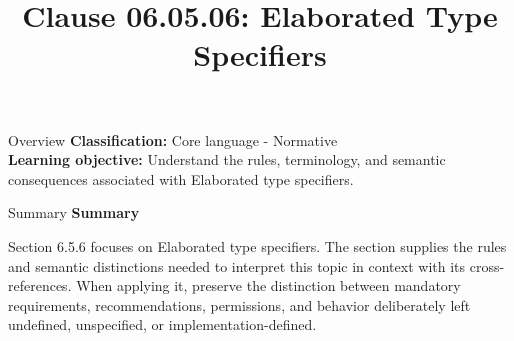 \documentclass[10pt,letterpaper]{article}
\title{Clause 06.05.06: Elaborated Type Specifiers}
\author{}
\date{}
\begin{document}
\maketitle
\begin{CornellOverviewBox}{Overview}
\textbf{Classification:} Core language - Normative\\[2pt]
\textbf{Learning objective:} Understand the rules, terminology, and semantic consequences associated with Elaborated type specifiers.
\end{CornellOverviewBox}\begin{CornellSummaryBox}{Summary}
{\sffamily\bfseries\color{Accent} Summary}\par\vspace{3pt}Section 6.5.6 focuses on Elaborated type specifiers. The section supplies the rules and semantic distinctions needed to interpret this topic in context with its cross-references. When applying it, preserve the distinction between mandatory requirements, recommendations, permissions, and behavior deliberately left undefined, unspecified, or implementation-defined.
\end{CornellSummaryBox}
\end{document}
